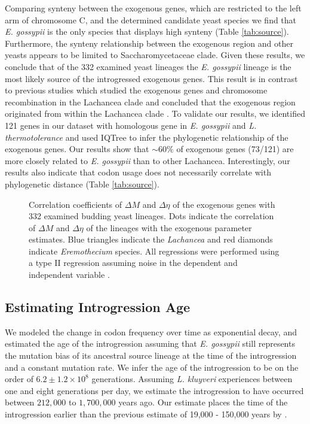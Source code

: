 \documentclass{bmcart}
\def\texttt{[image: ]}
\newcommand{\kluyveri}{\textit{L. kluyveri}\xspace}
\newcommand{\gossypii}{\textit{E. gossypii}\xspace}
\newcommand{\DM}{\ensuremath{{\Delta M}}\xspace}
\newcommand{\DE}{\ensuremath{{\Delta \eta}}\xspace}
\begin{document}
Comparing synteny between the exogenous genes, which are restricted to the left arm of chromosome C, and the determined candidate yeast species we find that \gossypii is the only species that displays high synteny (Table \ref{tab:source}).
Furthermore, the synteny relationship between the exogenous region and other yeasts appears to be limited to Saccharomycetaceae clade.
Given these results, we conclude that of the 332 examined yeast lineages the \gossypii lineage is the most likely source of the introgressed exogenous genes.
This result is in contrast to previous studies which studied the exogenous genes and chromosome recombination in the Lachancea clade and concluded that the exogenous region originated from within the Lachancea clade \citep{payen2009, friedrich2015, vakirlis2016}.
To validate our results, we identified 121 genes in our dataset \citep{shen2018} with homologous gene in \gossypii and \textit{L. thermotolerance} and used IQTree \citep{nguyen2015} to infer the phylogenetic relationship of the exogenous genes. Our results show that $\sim 60 \%$ of exogenous genes (73/121) are more closely related to \gossypii than to other Lachancea.
Interestingly, our results also indicate that codon usage does not necessarily correlate with phylogenetic distance (Table \ref{tab:source}). 

\begin{figure}
     \centering
	\caption{Correlation coefficients of \DM and \DE of the exogenous genes with 332 examined budding yeast lineages. 
	Dots indicate the correlation of \DM and \DE of the lineages with the exogenous parameter estimates.
	Blue triangles indicate the \textit{Lachancea} and red diamonds indicate \textit{Eremothecium} species.
	All regressions were performed using a type II regression assuming noise in the dependent and independent variable \citep{SokalAndRohlf1981}.}
	\label{fig:csp_exo_comp}
\end{figure}


\subsection*{Estimating Introgression Age}

We modeled the change in codon frequency over time as exponential decay, and estimated the age of the introgression assuming that \gossypii still represents the mutation bias of its ancestral source lineage at the time of the introgression and a constant mutation rate.
We infer the age of the introgression to be on the order of $6.2\pm1.2\times 10^8$ generations. 
Assuming \kluyveri experiences between one and eight generations per day, we estimate the introgression to have occurred between $212,000$ to $1,700,000$ years ago.
Our estimate places the time of the introgression earlier than the previous estimate of 19,000 - 150,000 years by \citet{friedrich2015}.
\end{document}
